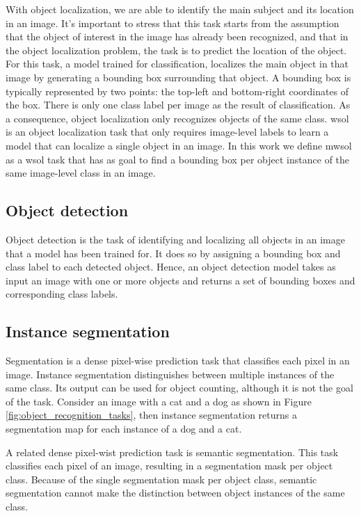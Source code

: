 With object localization, we are able to identify the main subject and its location in an image. It's important to stress that this task starts from the assumption that the object of interest in the image has already been recognized, and that in the object localization problem, the task is to predict the location of the object. For this task, a model trained for classification, localizes the main object in that image by generating a bounding box surrounding that object. A bounding box is typically represented by two points: the top-left and bottom-right coordinates of the box. There is only one class label per image as the result of classification. As a consequence, object localization only recognizes objects of the same class. \acrfull{wsol} \cite{zhou2016cvpr} is an object localization task that only requires image-level labels to learn a model that can localize a single object in an image. In this work we define \acrfull{mwsol} as a \acrshort{wsol} task that has as goal to find a bounding box per object instance of the same image-level class in an image.

\subsection{Object detection}
Object detection is the task of identifying and localizing all objects in an image that a model has been trained for. It does so by assigning a bounding box and class label to each detected object. Hence, an object detection model takes as input an image with one or more objects and returns a set of bounding boxes and corresponding class labels.

\subsection{Instance segmentation}
Segmentation is a dense pixel-wise prediction task that classifies each pixel in an image. Instance segmentation distinguishes between multiple instances of the same class. Its output can be used for object counting, although it is not the goal of the task.
Consider an image with a cat and a dog as shown in Figure \ref{fig:object_recognition_tasks}, then instance segmentation returns a segmentation map for each instance of a dog and a cat.

A related dense pixel-wist prediction task is semantic segmentation. This task classifies each pixel of an image, resulting in a segmentation mask per object class. Because of the single segmentation mask per object class, semantic segmentation cannot make the distinction between object instances of the same class.

